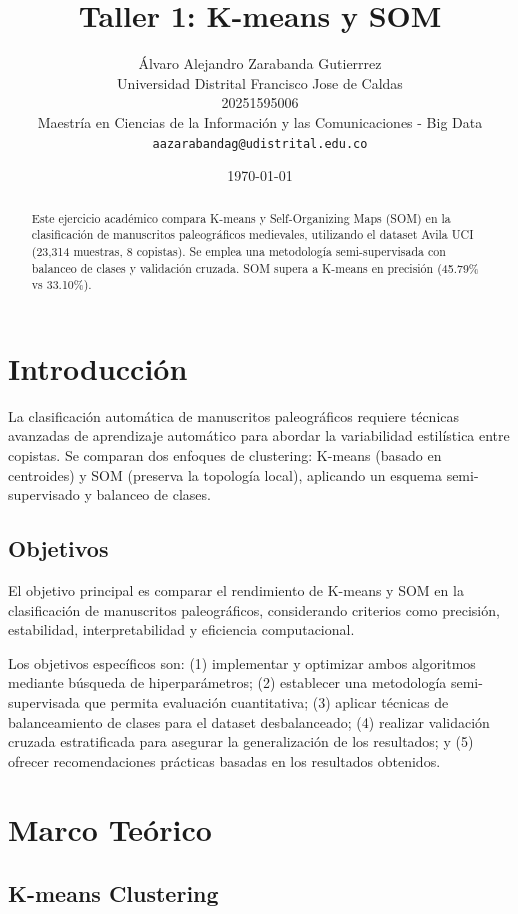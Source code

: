 \documentclass[12pt,a4paper]{article}
\title{\textbf{Taller 1: K-means y SOM}}
\author{
    Álvaro Alejandro Zarabanda Gutierrrez \\
    \small Universidad Distrital Francisco Jose de Caldas \\
    \small 20251595006 \\
    \small Maestría en Ciencias de la Información y las Comunicaciones - Big Data \\
    \small \texttt{aazarabandag@udistrital.edu.co}
}
\date{\today}
\begin{document}
\maketitle

\begin{abstract}
Este ejercicio académico compara K-means y Self-Organizing Maps (SOM) en la clasificación de manuscritos paleográficos medievales, utilizando el dataset Avila UCI (23,314 muestras, 8 copistas). Se emplea una metodología semi-supervisada con balanceo de clases y validación cruzada. SOM supera a K-means en precisión (45.79\% vs 33.10\%).
\end{abstract}

\tableofcontents
\newpage

\section{Introducción}


La clasificación automática de manuscritos paleográficos requiere técnicas avanzadas de aprendizaje automático para abordar la variabilidad estilística entre copistas. Se comparan dos enfoques de clustering: K-means (basado en centroides) y SOM (preserva la topología local), aplicando un esquema semi-supervisado y balanceo de clases.

\subsection{Objetivos}

El objetivo principal es comparar el rendimiento de K-means y SOM en la clasificación de manuscritos paleográficos, considerando criterios como precisión, estabilidad, interpretabilidad y eficiencia computacional.

Los objetivos específicos son: (1) implementar y optimizar ambos algoritmos mediante búsqueda de hiperparámetros; (2) establecer una metodología semi-supervisada que permita evaluación cuantitativa; (3) aplicar técnicas de balanceamiento de clases para el dataset desbalanceado; (4) realizar validación cruzada estratificada para asegurar la generalización de los resultados; y (5) ofrecer recomendaciones prácticas basadas en los resultados obtenidos.

\section{Marco Teórico}

\subsection{K-means Clustering}
\end{document}
